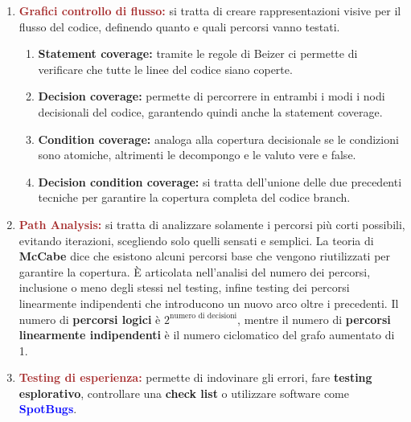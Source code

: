 \begin{enumerate}
  \item \textbf{\textcolor{brown}{Grafici controllo di flusso:}} si tratta di creare rappresentazioni visive per il flusso del codice, definendo quanto e quali percorsi vanno testati.
    \begin{enumerate}
      \item \textbf{Statement coverage:} tramite le regole di Beizer ci permette di verificare che tutte le linee del codice siano coperte.
      \item \textbf{Decision coverage:} permette di percorrere in entrambi i modi i nodi decisionali del codice, garantendo quindi anche la statement coverage.
      \item \textbf{Condition coverage:} analoga alla copertura decisionale se le condizioni sono atomiche, altrimenti le decompongo e le valuto vere e false.
      \item \textbf{Decision condition coverage:} si tratta dell'unione delle due precedenti tecniche per garantire la copertura completa del codice branch.
    \end{enumerate}
  \item \textbf{\textcolor{brown}{Path Analysis:}} si tratta di analizzare solamente i percorsi più corti possibili, evitando iterazioni, scegliendo solo quelli sensati e semplici. 
    La teoria di \textbf{McCabe} dice che esistono alcuni percorsi base che vengono riutilizzati per garantire la copertura. È articolata nell'analisi del numero dei percorsi,
    inclusione o meno degli stessi nel testing, infine testing dei percorsi linearmente indipendenti che introducono un nuovo arco oltre i precedenti.
    Il numero di \textbf{percorsi logici} è $2^{\text{numero di decisioni}}$, mentre il numero di \textbf{percorsi linearmente indipendenti} è il numero ciclomatico del grafo aumentato di 1.
  \item \textbf{\textcolor{brown}{Testing di esperienza:}} permette di indovinare gli errori, fare \textbf{testing esplorativo}, controllare una \textbf{check list} o utilizzare 
    software come \textbf{\textcolor{blue}{SpotBugs}}.
\end{enumerate}


